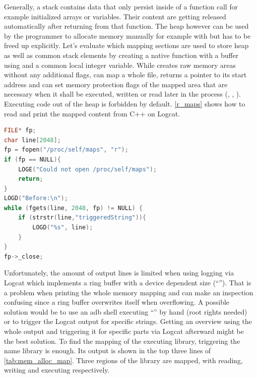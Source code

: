 Generally, a stack contains data that only persist inside of a function call for example initialized arrays or variables. Their content are getting released automatically after returning from that function.
The heap however can be used by the programmer to allocate memory
manually for example with  but has to be freed up explicitly.
Let's evaluate which mapping sections are used to store heap as well as common stack elements by creating a native function with a buffer using  and a common local integer variable.
While  creates raw memory areas
without any additional flags,  can map a whole file, returns a pointer to its start address and can set memory protection flags of the mapped area that are necessary when it shall be executed, written or read later in
the process
(, , ).
Executing code out of the heap is forbidden by default.
\autoref{r_maps} shows how to read and print the mapped content from C++ on Logcat.
\begin{lstlisting}[language=C++, caption=Reading /proc/self/maps, label=r_maps]
FILE* fp;
char line[2048];
fp = fopen("/proc/self/maps", "r");
if (fp == NULL){
    LOGE("Could not open /proc/self/maps");
    return;
}
LOGD("Before:\n");
while (fgets(line, 2048, fp) != NULL) {
    if (strstr(line,"triggeredString")){
        LOGD("%s", line);
    }
}
fp->_close;
\end{lstlisting}
Unfortunately, the amount of output lines is limited when using logging via Logcat which
implements a ring buffer with a device dependent size (``''). That
is a problem when printing the whole memory mapping and can make an inspection
confusing since a ring buffer overwrites itself when overflowing.
A possible solution would be to use an adb shell executing ``'' by hand (root rights needed)
or to trigger the Logcat output for specific strings. Getting an overview using the whole output and triggering it for specific parts via Logcat afterward might be the best solution.
To find the mapping of the executing library, triggering the name library is enough. Its output is shown in the top three lines of \autoref{tab:mem_alloc_map}. Three regions
of the library are mapped, with reading, writing and executing respectively.
